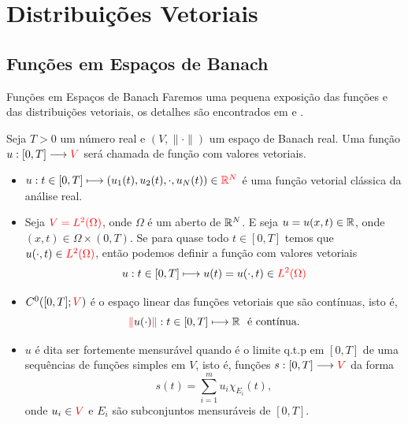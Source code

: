 \section{Distribuições Vetoriais}


\subsection*{Funções em Espaços de Banach}
\begin{frame}{Funções em Espaços de Banach}
Faremos uma pequena exposição das funções e das distribuições vetoriais, os detalhes são encontrados em   
{\color{blue}\cite{Bhat}} e {\color{blue}\cite[\S E.5]{evans}}.
\bigskip

Seja \(T>0\) um número real e {\color{red}\((V,\|\cdot\|)\)}	um espaço de Banach real. 
Uma função {\color{blue}\(u:[0,T]\longrightarrow {\color{red}V}\)} será 
chamada de  {\color{blue}função com valores vetoriais}.
\medskip

\begin{itemize}
\item \(u: t\in [0,T] \longmapsto\left(u_1(t),u_2(t),\cdot,u_N(t)\right)\in {\color{red}\mathbb{R}^N}\) é uma função vetorial clássica da análise real.

\item Seja \({\color{red}V=L^2(\Omega)}\), onde \(\Omega\) é um aberto de \(\mathbb{R}^N\). 
 E seja \(u=u(x,t)\in \mathbb{R}\), onde  \((x,t)\in \Omega \times (0,T)\). Se para quase todo 
 \(t\in [0,T]\) temos que \(u(\cdot,t)\in {\color{red}L^2(\Omega)}\), então podemos 
 definir a função com valores vetoriais
 \[u:t\in [0,T]\longmapsto u(t)=u(\cdot,t)\in {\color{red}L^2(\Omega)}\]
\end{itemize}
\end{frame}
\begin{frame}
\begin{itemize}
\item \(C^0([0,T];{\color{red}V})\) é o espaço linear das funções vetoriais que são 
contínuas, isto 
é,  
\[\nr{u(\cdot)}:t\in [0,T]\longmapsto \R\ \text{ é contínua}. \]

\item {\color{blue}\(u\)} é dita ser {\color{blue}fortemente mensurável} quando é o limite 
q.t.p em \([0,T]\)
de uma sequências de funções simples em {\color{red}\(V\)}, isto é, funções 
\(s:[0,T]\longrightarrow {\color{red}V} \) da forma
\[
s(t)=\sum_{i=1}^{m}u_i\chi_{E_i}(t),
\]
onde \(u_i\in {\color{red}V}\) e \(E_i\) são subconjuntos mensuráveis de \([0,T]\).
\end{itemize}


\end{frame}
